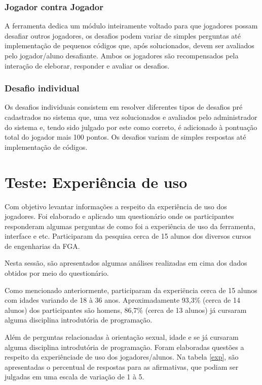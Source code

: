 \subsubsection{Jogador contra Jogador}
A ferramenta dedica um módulo inteiramente voltado para que jogadores possam desafiar outros jogadores, os
desafios podem variar de simples perguntas até implementação de pequenos códigos que, após solucionados, devem
ser avaliados pelo jogador/aluno desafiante. Ambos os jogadores são recompensados pela interação de eleborar, responder
e avaliar os desafios.


\subsubsection{Desafio individual}
Os desafios individuais consistem em resolver diferentes tipos de  desafios pré cadastrados no sistema que, uma vez 
solucionados e avaliados pelo administrador do sistema e, tendo sido julgado por este como correto, é adicionado à
pontuação total do jogador mais 100 pontos. Os  desafios variam de simples respostas até implementação de códigos.


\section{Teste: Experiência de uso}

Com objetivo levantar informações a respeito da experiência de uso dos jogadores. Foi elaborado e aplicado um questionário 
onde os participantes responderam algumas perguntas de como foi a experiência de uso da ferramenta, interface e etc. Participaram da pesquisa
cerca de 15 alunos dos diversos cursos de engenharias da FGA.

Nesta sessão, são apresentados algumas análises realizadas em cima dos dados obtidos por meio do questionário.

Como mencionado anteriormente, participaram da experiëncia cerca de 15 alunos com idades variando de 18 à 36 anos. 
Aproximadamente 93,3\% (cerca de 14 alunos) dos participantes são homens, 86,7\% (cerca de 13 alunos) já cursaram alguma
disciplina introdutória de programação.

Além de perguntas relacionadas à orientação sexual, idade e se já cursaram alguma disciplina introdutória de programação.
Foram elaboradas questões a respeito da experiênciade de uso dos jogadores/alunos. Na tabela \ref{exp}, são apresentadas 
o percentual de respostas para as afirmativas, que podiam ser julgadas em uma escala de variação de 1 à 5.

